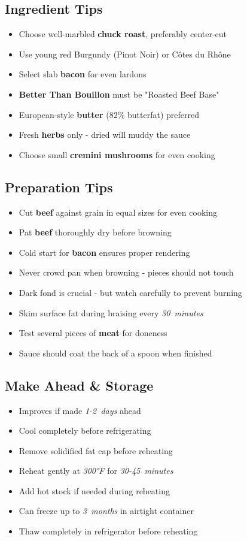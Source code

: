 \documentclass[11pt,letterpaper]{article}
\begin{document}
{\begin{multicols}{2}
\subsection*{Ingredient Tips}
\begin{itemize}
    \item Choose well-marbled \textbf{chuck roast}, preferably center-cut
    \item Use young red Burgundy (Pinot Noir) or Côtes du Rhône
    \item Select slab \textbf{bacon} for even lardons
    \item \textbf{Better Than Bouillon} must be "Roasted Beef Base"
    \item European-style \textbf{butter} (82\% butterfat) preferred
    \item Fresh \textbf{herbs} only - dried will muddy the sauce
    \item Choose small \textbf{cremini mushrooms} for even cooking
\end{itemize}

\subsection*{Preparation Tips}
\begin{itemize}
    \item Cut \textbf{beef} against grain in equal sizes for even cooking
    \item Pat \textbf{beef} thoroughly dry before browning
    \item Cold start for \textbf{bacon} ensures proper rendering
    \item Never crowd pan when browning - pieces should not touch
    \item Dark fond is crucial - but watch carefully to prevent burning
    \item Skim surface fat during braising every \textit{30~minutes}
    \item Test several pieces of \textbf{meat} for doneness
    \item Sauce should coat the back of a spoon when finished
\end{itemize}

\subsection*{Make Ahead \& Storage}
\begin{itemize}
    \item Improves if made \textit{1-2~days} ahead
    \item Cool completely before refrigerating
    \item Remove solidified fat cap before reheating
    \item Reheat gently at \textit{300°F} for \textit{30-45~minutes}
    \item Add hot stock if needed during reheating
    \item Can freeze up to \textit{3~months} in airtight container
    \item Thaw completely in refrigerator before reheating
\end{itemize}


\end{multicols}}
\end{document}
